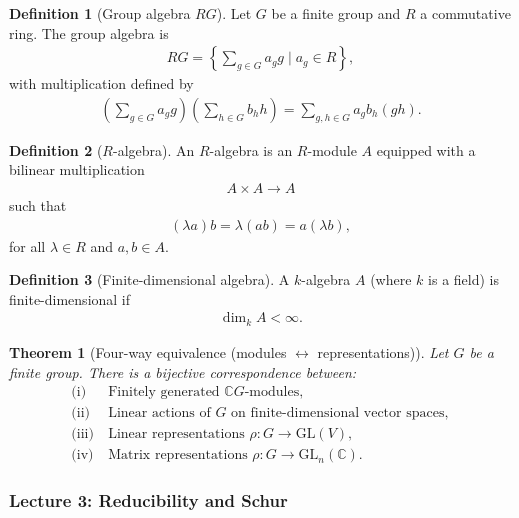 \documentclass[titlepage]{article}
\theoremstyle{plain}
\newtheorem{theorem}{Theorem}[section]
\theoremstyle{definition}
\newtheorem{definition}{Definition}[section]
\theoremstyle{remark}
\theoremstyle{exercise-style}
\numberwithin{equation}{section}
\numberwithin{theorem}{section}
\numberwithin{remark}{section}
\begin{document}
\begin{definition}[Group algebra $RG$]
Let $G$ be a finite group and $R$ a commutative ring. The group algebra is
\begin{align}
RG = \left\{ \sum_{g \in G} a_g g \mid a_g \in R \right\},
\end{align}
with multiplication defined by
\begin{align}
\left(\sum_{g \in G} a_g g\right)\left(\sum_{h \in G} b_h h\right)
= \sum_{g,h \in G} a_g b_h (gh).
\end{align}
\end{definition}

\begin{definition}[$R$-algebra]
An $R$-algebra is an $R$-module $A$ equipped with a bilinear multiplication
\begin{align}
A \times A \to A
\end{align}
such that
\begin{align}
(\lambda a)b = \lambda(ab) = a(\lambda b),
\end{align}
for all $\lambda \in R$ and $a,b \in A$.
\end{definition}

\begin{definition}[Finite-dimensional algebra]
A $k$-algebra $A$ (where $k$ is a field) is finite-dimensional if
\begin{align}
\dim_k A < \infty.
\end{align}
\end{definition}

\begin{theorem}[Four-way equivalence (modules $\leftrightarrow$ representations)]
Let $G$ be a finite group. There is a bijective correspondence between:
\begin{align}
\text{(i)} & \ \text{Finitely generated $\mathbb{C}G$-modules}, \\
\text{(ii)} & \ \text{Linear actions of $G$ on finite-dimensional vector spaces}, \\
\text{(iii)} & \ \text{Linear representations } \rho: G \to \mathrm{GL}(V), \\
\text{(iv)} & \ \text{Matrix representations } \rho: G \to \mathrm{GL}_n(\mathbb{C}).
\end{align}
\end{theorem}

\subsubsection{Lecture 3: Reducibility and Schur}
\end{document}
